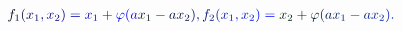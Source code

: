 \documentclass[12pt]{article}
\begin{document}
\makeatletter
\renewcommand*{\@textcolor}[3]{%
  \protect\leavevmode
  \begingroup
    \color#1{#2}#3%
  \endgroup
}
\makeatother
\begin{displaymath}
\begin{array} {c} \mathcolor[RGB]{0,0,15}{\textstyle} { \mathcolor[RGB]{0,0,30}{f} _ { \mathcolor[RGB]{0,0,45}{1} } \mathcolor[RGB]{0,0,60}{(} \mathcolor[RGB]{0,0,75}{x} _ { \mathcolor[RGB]{0,0,90}{1} } \mathcolor[RGB]{0,0,105}{,} \mathcolor[RGB]{0,0,120}{x} _ { \mathcolor[RGB]{0,0,135}{2} } \mathcolor[RGB]{0,0,150}{)} \mathcolor[RGB]{0,0,165}{=} \mathcolor[RGB]{0,0,180}{x} _ { \mathcolor[RGB]{0,0,195}{1} } \mathcolor[RGB]{0,0,210}{+} \mathcolor[RGB]{0,0,225}{\varphi} \mathcolor[RGB]{0,0,240}{(} \mathcolor[RGB]{0,0,255}{a} \mathcolor[RGB]{0,15,0}{x} _ { \mathcolor[RGB]{0,15,15}{1} } \mathcolor[RGB]{0,15,30}{-} \mathcolor[RGB]{0,15,45}{a} \mathcolor[RGB]{0,15,60}{x} _ { \mathcolor[RGB]{0,15,75}{2} } \mathcolor[RGB]{0,15,90}{)} \mathcolor[RGB]{0,15,105}{,} \mathcolor[RGB]{0,15,120}{f} _ { \mathcolor[RGB]{0,15,135}{2} } \mathcolor[RGB]{0,15,150}{(} \mathcolor[RGB]{0,15,165}{x} _ { \mathcolor[RGB]{0,15,180}{1} } \mathcolor[RGB]{0,15,195}{,} \mathcolor[RGB]{0,15,210}{x} _ { \mathcolor[RGB]{0,15,225}{2} } \mathcolor[RGB]{0,15,240}{)} \mathcolor[RGB]{0,15,255}{=} \mathcolor[RGB]{0,30,0}{x} _ { \mathcolor[RGB]{0,30,15}{2} } \mathcolor[RGB]{0,30,30}{+} \mathcolor[RGB]{0,30,45}{\varphi} \mathcolor[RGB]{0,30,60}{(} \mathcolor[RGB]{0,30,75}{a} \mathcolor[RGB]{0,30,90}{x} _ { \mathcolor[RGB]{0,30,105}{1} } \mathcolor[RGB]{0,30,120}{-} \mathcolor[RGB]{0,30,135}{a} \mathcolor[RGB]{0,30,150}{x} _ { \mathcolor[RGB]{0,30,165}{2} } \mathcolor[RGB]{0,30,180}{)} \mathcolor[RGB]{0,30,195}{.} } \end{array}
\end{displaymath}
\end{document}
